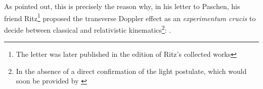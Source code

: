 \documentclass[pdflatex,sn-basic]{sn-jnl}
\newcommand{\tDe}{transverse Doppler effect\xspace}
\newcommand{\me}{; my emphasis}
\begin{document}
%
As \Ehr pointed out, this is precisely the reason why, in his letter to Paschen, his friend Ritz\footnote{The letter was later published in the \citeyear{Ritz1911} edition of Ritz’s collected works} proposed the \tDe as an \textit{experimentum crucis} to decide between classical and relativistic kinematics\footnote{In the absence of a direct confirmation of the light postulate, which would soon be provided by \citet{Sitter1913}}:  \citep[319\me]{Ehrenfest1912}.
\end{document}
